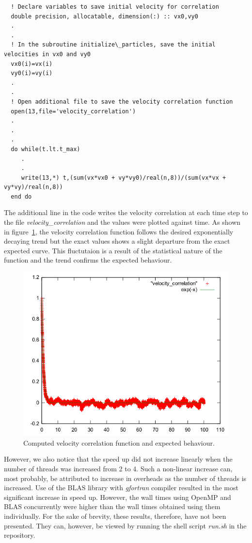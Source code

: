 \documentclass[11pt, oneside]{article}
\begin{document}
\begin{lstlisting}
  ! Declare variables to save initial velocity for correlation
  double precision, allocatable, dimension(:) :: vx0,vy0
  .
  .
  ! In the subroutine initialize\_particles, save the initial velocities in vx0 and vy0
  vx0(i)=vx(i)
  vy0(i)=vy(i)
  .
  .
  ! Open additional file to save the velocity correlation function
  open(13,file='velocity_correlation')
  .
  .
  .
  do while(t.lt.t_max)
     .
     .
     write(13,*) t,(sum(vx*vx0 + vy*vy0)/real(n,8))/(sum(vx*vx + vy*vy)/real(n,8))
  end do
\end{lstlisting}     

The additional line in the code writes the velocity correlation at each time step to the file \textit{velocity\_correlation} and the values were plotted against time. As shown in figure~\ref{fig:vcf}, the velocity correlation function follows the desired exponentially decaying trend but the exact values shows a slight departure from the exact expected curve. This fluctutaion is a result of the statistical nature of the function and the trend confirms the expected behaviour. 
	\begin{figure}[h]
		\centering
		\includegraphics[width=\textwidth]{vcf.png}
		\caption{Computed velocity correlation function and expected behaviour.}
		\label{fig:vcf}
	\end{figure} 


        However, we also notice that the speed up did not increase linearly when the number of threads was increased from 2 to 4. Such a non-linear increase can, most probably, be attributed to increase in overheads as the number of threads is increased. Use of the BLAS library with \textit{gfortran} compiler resulted in the most significant increase in speed up. However, the wall times using OpenMP and BLAS concurrently were higher than the wall times obtained using them individually. For the sake of brevity, these results, therefore, have not been presented. They can, however, be viewed by running the shell script \textit{run.sh} in the repository.
\end{document}
